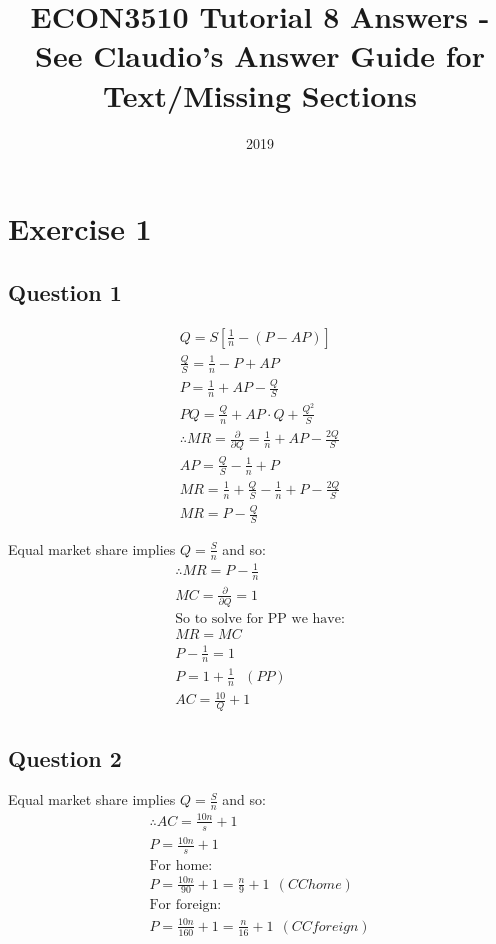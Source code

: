 \documentclass{article}
\title{ECON3510 Tutorial 8 Answers - See Claudio's Answer Guide for Text/Missing Sections}
\date{2019}
\begin{document}
\maketitle

\section{Exercise 1}
\vspace{6mm}
\subsection{Question 1}

\begin{gather*}
  Q = S [\frac{1}{n} - (P - AP)] \\
  \frac{Q}{S} = \frac{1}{n} - P + AP \\
  P = \frac{1}{n} + AP - \frac{Q}{S} \\
  PQ = \frac{Q}{n} + AP \cdot Q + \frac{Q^{2}}{S} \\
  \therefore MR = \frac{\partial }{ \partial Q} = \frac{1}{n} + AP - \frac{2Q}{S}  \\
  AP = \frac{Q}{S} - \frac{1}{n} + P \\
  MR = \frac{1}{n} + \frac{Q}{S} - \frac{1}{n} + P - \frac{2Q}{S} \\
  MR = P - \frac{Q}{S}
\end{gather*}

Equal market share implies $Q = \frac{S}{n}$ and so:
\begin{gather*}
  \therefore MR = P - \frac{1}{n} \\
  MC = \frac{\partial}{\partial Q} = 1 \\
  \text{So to solve for PP we have:}  \\
  MR = MC \\
  P - \frac{1}{n} = 1 \\
  P = 1 + \frac{1}{n} \ \ \ (PP) \\
  AC = \frac{10}{Q} + 1
\end{gather*}


\vspace{6mm}
\subsection{Question 2}

Equal market share implies $Q = \frac{S}{n}$ and so:
\begin{gather*}
  \therefore AC = \frac{10n}{s} + 1 \\
  P = \frac{10n}{s} + 1 \\
  \text{For home:} \\
  P = \frac{10n}{90} + 1 = \frac{n}{9} + 1 \ \ (CC home) \\
  \text{For foreign:} \\
  P = \frac{10n}{160} + 1 = \frac{n}{16} + 1 \ \ (CC foreign)
\end{gather*}
\end{document}
